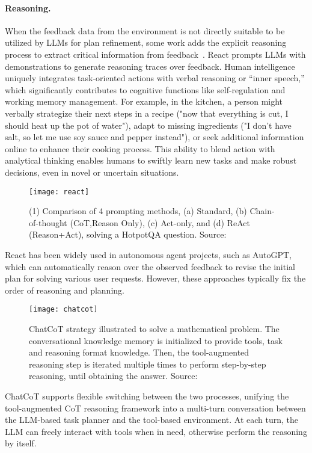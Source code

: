 \paragraph{Reasoning.}
\label{par:reasoning}

When the feedback data from the environment is not directly suitable to be utilized by LLMs for plan refinement, some work adds the explicit reasoning process to extract critical information from feedback~\cite{chen2023chatcot, yao2022react}.
React prompts LLMs with demonstrations to generate reasoning traces over feedback.
Human intelligence uniquely integrates task-oriented actions with verbal reasoning or “inner speech,” which significantly contributes to cognitive functions like self-regulation and working memory management.
For example, in the kitchen, a person might verbally strategize their next steps in a recipe ("now that everything is cut, I should heat up the pot of
water"), adapt to missing ingredients ("I don’t have salt, so let me use soy sauce and pepper instead"), or seek additional information online to enhance their cooking process.
This ability to blend action with analytical thinking enables humans to swiftly learn new tasks and make robust decisions, even in novel or uncertain situations.
\begin{figure}[h!]
	\centering
	\texttt{[image: react]}
	\caption{(1) Comparison of 4 prompting methods, (a) Standard, (b) Chain-of-thought (CoT,Reason Only), (c) Act-only, and (d) ReAct (Reason+Act), solving a HotpotQA \cite{yang2018hotpotqa} question. Source: \textcite{chen2023chatcot}}
	\label{fig:react}
\end{figure}
React has been widely used in autonomous agent projects, such as AutoGPT, which can automatically reason over the observed feedback to revise the initial plan for solving various user requests.
However, these approaches typically fix the order of reasoning and planning.
\begin{figure}[h!]
	\centering
	\texttt{[image: chatcot]}
	\caption{ChatCoT strategy illustrated to solve a mathematical problem. The conversational knowledge memory is initialized to provide tools, task and reasoning format knowledge. Then, the tool-augmented reasoning step is iterated multiple times to perform step-by-step reasoning, until obtaining the answer. Source: \textcite{chen2023chatcot}}
	\label{fig:chatcot}
\end{figure}

ChatCoT supports flexible switching between the two processes, unifying the tool-augmented CoT reasoning framework into a multi-turn conversation between the LLM-based task planner and the tool-based environment.
At each turn, the LLM can freely interact with tools when in need, otherwise perform the reasoning by itself.

